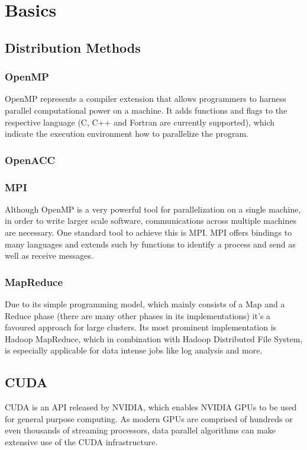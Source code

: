 \chapter{Basics}

\section{Distribution Methods}
\label{distribution}
\subsection{OpenMP}
OpenMP represents a compiler extension that allows programmers to harness parallel computational power on a machine. It adds functions and flags to the respective language (C, C++ and Fortran are currently supported), which indicate the execution environment how to parallelize the program.

\subsection{OpenACC}

\subsection{MPI}
Although OpenMP is a very powerful tool for parallelization on a single machine, in order to write larger scale software, communications across multiple machines are necessary. One standard tool to achieve this is MPI.
MPI offers bindings to many languages and extends such by functions to identify a process and send as well as receive messages.

\subsection{MapReduce}
Due to its simple programming model, which mainly consists of a Map and a Reduce phase (there are many other phases in its implementations) it's a favoured approach for large clusters. Its most prominent implementation is Hadoop MapReduce, which in combination with Hadoop Distributed File System, is especially applicable for data intense jobs like log analysis and more.

\section{CUDA}

CUDA is an API released by NVIDIA, which enables NVIDIA GPUs to be used for general purpose computing. As modern GPUs are comprised of hundreds or even thousands of streaming processors, data parallel algorithms can make extensive use of the CUDA infrastructure.

